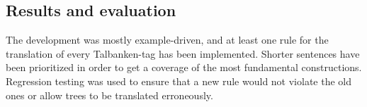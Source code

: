 \documentclass[10pt, a4paper]{article}
\begin{document}
%
%
%
\subsection{Results and evaluation}
The development was mostly example-driven, and at least one rule for the translation of
every Talbanken-tag has been implemented.
Shorter sentences have been prioritized in order to get a coverage of the most
fundamental constructions. 
Regression testing was used to ensure that a new rule would not violate the old ones
or allow trees to be translated erroneously.
\end{document}

